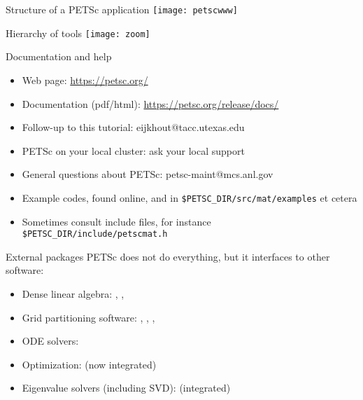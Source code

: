 \begin{numberedframe}{Structure of a PETSc application}
 \texttt{[image: petscwww]}
\end{numberedframe}

\begin{numberedframe}{Hierarchy of tools}
 \texttt{[image: zoom]}
\end{numberedframe}

\begin{numberedframe}{Documentation and help}
\begin{itemize}
\item Web page: \url{https://petsc.org/}
\item Documentation (pdf/html): \url{https://petsc.org/release/docs/}
\item Follow-up to this tutorial: eijkhout@tacc.utexas.edu
\item PETSc on your local cluster: ask your local support
\item General questions about PETSc: petsc-maint@mcs.anl.gov
\item Example codes, found online, and in \verb+$PETSC_DIR/src/mat/examples+
et cetera
\item Sometimes consult include files, for instance
\verb+$PETSC_DIR/include/petscmat.h+
\end{itemize}
\end{numberedframe}

\begin{details}
\begin{numberedframe}{External packages}
PETSc does not do everything, but it interfaces to other software:
  \begin{itemize}
  \item Dense linear algebra: , , 
  \item Grid partitioning software: , , , 
  \item ODE solvers: 
  \item Optimization:  (now integrated)
  \item Eigenvalue solvers (including SVD):  (integrated)
  \end{itemize}
\end{numberedframe}
\end{details}

